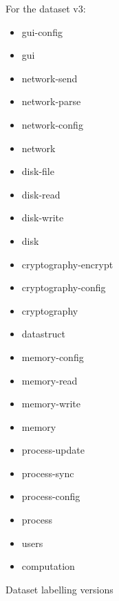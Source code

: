 \begin{appendices}
\begin{figure}[H]
For the dataset v3:\\
%
{\footnotesize
\begin{itemize}
    \item gui-config
    \item gui

    \item network-send
    \item network-parse
    \item network-config
    \item network

    \item disk-file
    \item disk-read
    \item disk-write
    \item disk


    \item cryptography-encrypt
    \item cryptography-config
    \item cryptography
\end{itemize}
}
\endminipage
{}%
  
{\footnotesize
\begin{itemize}
    \item datastruct

    \item memory-config
    \item memory-read
    \item memory-write
    \item memory


    \item process-update
    \item process-sync    
    \item process-config  
    \item process

    \item users
    \item computation
\end{itemize}
}
\endminipage
\endminipage
\caption{Dataset labelling versions}\label{fig:labelling_versions}
\end{figure}


















\end{appendices}
